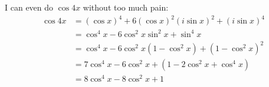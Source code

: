 

I can even do $\cos 4x$ without too much pain:
\begin{align*}
\cos 4x 
&= (\cos x)^4 + 6(\cos x)^2(i\sin x)^2 + (i\sin x)^4 \\
&= \cos^4 x - 6\cos^2 x\sin^2 x + \sin^4 x \\
&= \cos^4 x - 6\cos^2 x(1 - \cos^2 x) + (1 - \cos^2 x)^2 \\
&= 7\cos^4 x - 6\cos^2 x + (1 - 2\cos^2 x + \cos^4 x) \\
&= 8\cos^4 x - 8 \cos^2 x + 1 \\
\end{align*}














